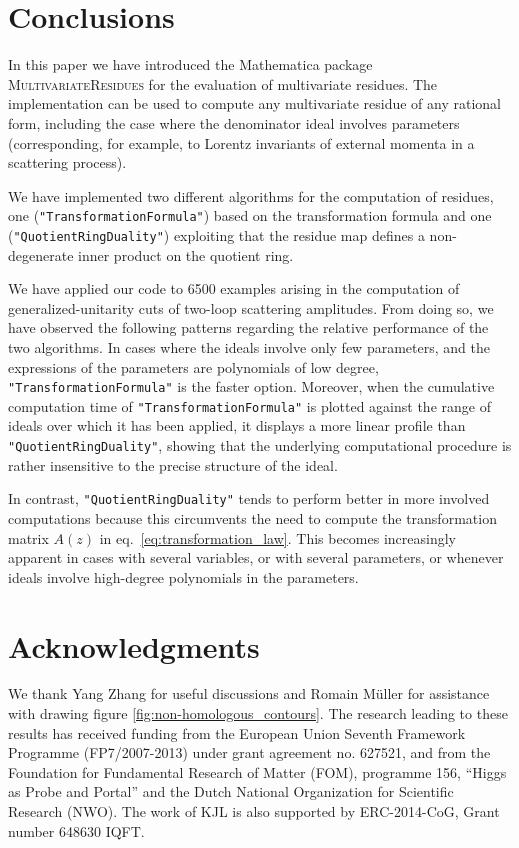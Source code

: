 \documentclass[dvipsnames,preprint,12pt,sort&compress]{elsarticle}
\newcommand{\Math}[1]
{\lstinline[style=Mathematica,breaklines=false,basicstyle=\small \ttfamily\null]~#1~}
\begin{document}
\section{Conclusions}\label{sec:Conclusions}

In this paper we have introduced the Mathematica package
\textsc{MultivariateResidues} for the evaluation of multivariate residues.
The implementation can be used to compute any multivariate
residue of any rational form, including the case where the denominator ideal involves
parameters (corresponding, for example, to Lorentz invariants of external
momenta in a scattering process).

We have implemented two different algorithms for the computation of residues,
one (\Math{"TransformationFormula"}) based on the transformation formula
and one (\Math{"QuotientRingDuality"}) exploiting that the residue map
defines a non-degenerate inner product on the quotient ring.

We have applied our code to 6500 examples arising in the computation of
generalized-unitarity cuts of two-loop scattering amplitudes. From doing so,
we have observed the following patterns regarding the relative performance of the
two algorithms. In cases where the ideals involve only few parameters, and the
expressions of the parameters are polynomials of low degree, \Math{"TransformationFormula"}
is the faster option. Moreover, when the
cumulative computation time of \Math{"TransformationFormula"} is plotted against
the range of ideals over which it has been applied, it displays a more linear profile
than \Math{"QuotientRingDuality"}, showing that the underlying computational
procedure is rather insensitive to the precise structure of the ideal.

In contrast, \Math{"QuotientRingDuality"} tends to perform better in more
involved computations because this circumvents the need to compute the transformation matrix
$A(z)$ in eq.~\eqref{eq:transformation_law}. This becomes increasingly apparent in
cases with several variables, or with several parameters, or
whenever ideals involve high-degree polynomials in the parameters.



\section*{Acknowledgments}
We thank Yang Zhang for useful discussions and Romain M{\"u}ller for assistance
with drawing figure \ref{fig:non-homologous_contours}.
%
The research leading to these results has received funding from the European Union Seventh Framework Programme (FP7/2007-2013) under grant agreement no. 627521, and from the Foundation for Fundamental Research of Matter (FOM), programme 156, ``Higgs as Probe and Portal'' and the Dutch National Organization for Scientific Research (NWO).
%
The work of KJL is also supported by ERC-2014-CoG, Grant number 648630 IQFT.
\end{document}
